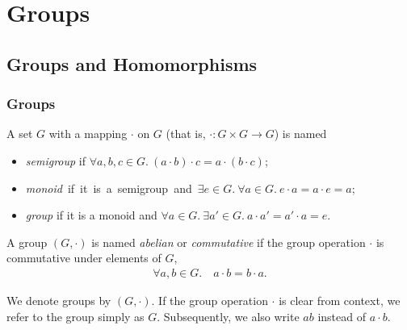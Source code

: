
\part{Groups}\label{cha:groups}
\chapter{Groups and Homomorphisms}
\section{Groups}
\begin{defn}\leavevmode
\begin{defnlist}
    \item A set $G$ with a mapping $\cdot$ on $G$ (that is, $\cdot: G \times G \to G$) is named \begin{itemize}
        \item \emph{semigroup} if $\forall a, b, c \in G.\ (a \cdot b) \cdot c = a \cdot (b \cdot c)$; 
        \item \mbox{\emph{monoid} if it is a semigroup and $\exists e \in G.\ \forall a \in G.\ e \cdot a = a \cdot e = a$; }
        \item \emph{group} if it is a monoid and $\forall a \in G.\ \exists a' \in G.\ a \cdot a' = a' \cdot a = e$. 
    \end{itemize}
    
    \item A group $(G,\cdot)$ is named \emph{abelian} or \emph{commutative} if the group operation $\cdot$ is commutative under elements of $G$, \begin{align}
        \forall a, b \in G.\quad a \cdot b = b \cdot a.
    \end{align}
    
    \begin{marginfigure}
        We denote groups by $(G,\cdot)$. If the group operation $\cdot$ is clear from context, we refer to the group simply as $G$. Subsequently, we also write $a b$ instead of $a \cdot b$.
    \end{marginfigure}
\end{defnlist}
\end{defn}


